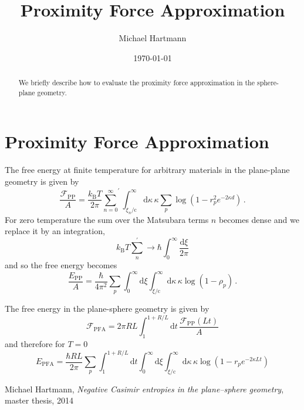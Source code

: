 \documentclass[twocolumn,superscriptaddress,prb]{revtex4-1}
\newcommand{\e}{e}    %
\newcommand{\sol}{\mathrm{c}} %
\newcommand{\kb}{k_\mathrm{B}} %
\begin{document}
\title{Proximity Force Approximation}

\author{Michael Hartmann}

\date{\today}

\begin{abstract}
We briefly describe how to evaluate the proximity force approximation in the sphere-plane geometry.
\end{abstract}

\maketitle
\section{Proximity Force Approximation}

The free energy at finite temperature for arbitrary materials in the plane-plane geometry is given by\cite{hartmann}
\begin{equation}
\frac{\mathcal{F}_\text{PP}}{A} = \frac{\kb T}{2\pi} {\sum_{n=0}^\infty}^\prime \int_{\xi_n/\sol}^\infty \mathrm{d}\kappa \, \kappa \sum_p \log\left(1-r_p^2 \e^{-2\kappa d}\right) \,.
\end{equation}
For zero temperature the sum over the Matsubara terms $n$ becomes dense and we
replace it by an integration,
\begin{equation}
\kb T \sum_n^\prime \to \hbar \int_0^\infty \frac{\mathrm{d}\xi}{2\pi}
\end{equation}
and so the free energy becomes
\begin{equation}
\frac{E_\text{PP}}{A} = \frac{\hbar}{4\pi^2} \sum_p \int_0^\infty \mathrm{d}\xi \int_{\xi/\sol}^\infty \mathrm{d}\kappa \, \kappa \log\left(1-\rho_p\right)\,.
\end{equation}

The free energy in the plane-sphere geometry is given by
\begin{equation}
\mathcal{F}_\text{PFA} = 2\pi RL \int_1^{1+R/L} \mathrm{d}t \, \frac{\mathcal{F}_\text{PP}(Lt)}{A}
\end{equation}
and therefore for $T=0$
\begin{equation}
E_\text{PFA} = \frac{\hbar RL}{2\pi} \sum_p \int_1^{1+R/L} \mathrm{d}t \int_0^\infty \mathrm{d}\xi \int_{\xi/\sol}^\infty \mathrm{d}\kappa \, \kappa \log\left(1-r_p \e^{-2\kappa L t}\right)
\end{equation}



\begin{thebibliography}{99}

  Michael Hartmann,
  \emph{Negative Casimir entropies in the plane–sphere geometry}, master thesis, 2014

\end{thebibliography}
\end{document}

